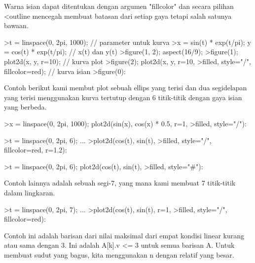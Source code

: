 \documentclass[a4paper,10pt]{article}
\begin{document}
\begin{eulernotebook}
\begin{eulercomment}
\begin{eulercomment}
\begin{eulercomment}
\begin{eulercomment}
\begin{eulercomment}
Warna isian dapat ditentukan dengan argumen "fillcolor" dan secara
pilihan \textless{}outline mencegah membuat batasan dari setiap gaya tetapi
salah satunya bawaan.
\end{eulercomment}
\begin{eulerprompt}
>t = linspace(0, 2pi, 1000); // parameter untuk kurva
>x = sin(t) * exp(t/pi); y = cos(t) * exp(t/pi); // x(t) dan y(t)
>figure(1, 2); aspect(16/9);
>figure(1); plot2d(x, y, r=10); // kurva plot
>figure(2); plot2d(x, y, r=10, >filled, style="/", fillcolor=red); // kurva isian
>figure(0):
\end{eulerprompt}
\begin{eulercomment}
Contoh berikut kami membut plot sebuah ellips yang terisi dan dua
segidelapan yang terisi menggunakan kurva tertutup dengan 6
titik-titik dengan gaya isian yang berbeda.
\end{eulercomment}
\begin{eulerprompt}
>x = linspace(0, 2pi, 1000); plot2d(sin(x), cos(x) * 0.5, r=1, >filled, style="/"):
\end{eulerprompt}
\begin{eulerprompt}
>t = linspace(0, 2pi, 6); ...
>plot2d(cos(t), sin(t), >filled, style="/", fillcolor=red, r=1.2):
\end{eulerprompt}
\begin{eulerprompt}
>t = linspace(0, 2pi, 6); plot2d(cos(t), sin(t), >filled, style="#"):
\end{eulerprompt}
\begin{eulercomment}
Contoh lainnya adalah sebuah segi-7, yang mana kami membuat 7
titik-titik dalam lingkaran.
\end{eulercomment}
\begin{eulerprompt}
>t = linspace(0, 2pi, 7); ...
>plot2d(cos(t), sin(t), r=1, >filled, style="/", fillcolor=red):
\end{eulerprompt}
\begin{eulercomment}
Contoh ini adalah barisan dari nilai maksimal dari empat kondisi
linear kurang atau sama dengan 3. Ini adalah A[k].v \textless{}= 3 untuk semua
barisan A. Untuk membuat sudut yang bagus, kita menggunakan n dengan
relatif yang besar.

\end{eulercomment}
\end{eulercomment}
\end{eulercomment}
\end{eulercomment}
\end{eulercomment}
\end{eulernotebook}
\end{document}
